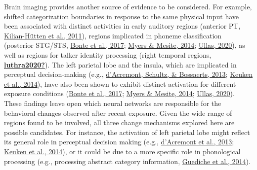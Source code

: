 \documentclass[
  11pt,
  english,
  man,floatsintext]{apa6}
\begin{document}
Brain imaging provides another source of evidence to be considered. For example, shifted categorization boundaries in response to the same physical input have been associated with distinct activities in early auditory regions (anterior PT, \protect\hyperlink{ref-kilianhutten2011}{Kilian-Hütten et al., 2011}), regions implicated in phoneme classification (posterior STG/STS, \protect\hyperlink{ref-bonte2017}{Bonte et al., 2017}; \protect\hyperlink{ref-myers-mesite2014}{Myers \& Mesite, 2014}; \protect\hyperlink{ref-ullas2020}{Ullas, 2020}), as well as regions for talker identity processing (right temporal regions, \protect\hyperlink{ref-luthra2020}{\textbf{luthra2020?}}). The left parietal lobe and the insula, which are implicated in perceptual decision-making (e.g., \protect\hyperlink{ref-dacremont2013}{d'Acremont, Schultz, \& Bossaerts, 2013}; \protect\hyperlink{ref-keuken2014}{Keuken et al., 2014}), have also been shown to exhibit distinct activation for different exposure conditions (\protect\hyperlink{ref-bonte2017}{Bonte et al., 2017}; \protect\hyperlink{ref-myers-mesite2014}{Myers \& Mesite, 2014}; \protect\hyperlink{ref-ullas2020}{Ullas, 2020}). These findings leave open which neural networks are responsible for the behavioral changes observed after recent exposure. Given the wide range of regions found to be involved, all three change mechanisms explored here are possible candidates. For instance, the activation of left parietal lobe might reflect its general role in perceptual decision making (e.g., \protect\hyperlink{ref-dacremont2013}{d'Acremont et al., 2013}; \protect\hyperlink{ref-keuken2014}{Keuken et al., 2014}), or it could be due to a more specific role in phonological processing (e.g., processing abstract category information, \protect\hyperlink{ref-guediche2014}{Guediche et al., 2014}).
\end{document}

